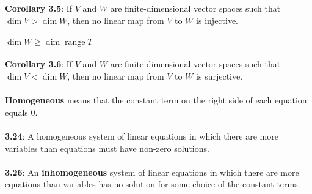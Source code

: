 \documentclass{article}
\DeclareMathOperator{\Range}{range}
\DeclareMathOperator{\Dim}{dim}
\theoremstyle{definition}
\begin{document}
\textbf{Corollary 3.5}: If $V$ and $W$ are finite-dimensional vector spaces such that $\Dim{V} > \Dim{W}$, then no linear map from $V$ to $W$ is injective. \\ \\
$\Dim{W} \geq \Dim{\Range{T}}$ \\ \\
\textbf{Corollary 3.6}: If $V$ and $W$ are finite-dimensional vector spaces such that $\Dim{V} < \Dim{W}$, then no linear map from $V$ to $W$ is surjective. \\ \\
\textbf{Homogeneous} means that the constant term on the right side of each equation equals 0. \\ \\
\textbf{3.24}: A homogeneous system of linear equations in which there are more variables than equations must have non-zero solutions. \\ \\ 
\textbf{3.26}: An \textbf{inhomogeneous} system of linear equations in which there are more equations than variables has no solution for some choice of the constant terms.
\end{document}
